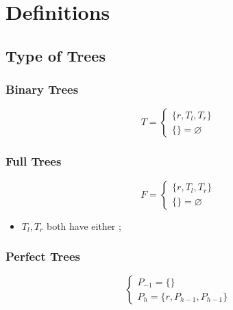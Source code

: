\section{Definitions}

\subsection{Type of Trees}

  \subsubsection{Binary Trees}

    \begin{equation}
      T = 
      \begin{cases}
        \{ r, T_{l}, T_{r} \} \\ 
        \{ \} = \varnothing
      \end{cases}
    \end{equation}

  \subsubsection{Full Trees}

    \begin{equation}
      F = 
      \begin{cases}
        \{ r, T_{l}, T_{r} \} \\ 
        \{ \} = \varnothing
      \end{cases}
    \end{equation}
    
    \begin{itemize}
      \item $ T_{l}, T_{r} $ both have either ;
    \end{itemize}

  \subsubsection{Perfect Trees}

    \begin{equation}
      \begin{cases}
        P_{-1} = \{ \} \\ 
        P_{h} = \{ r, P_{h - 1}, P_{h - 1} \}
      \end{cases}
    \end{equation}
    
